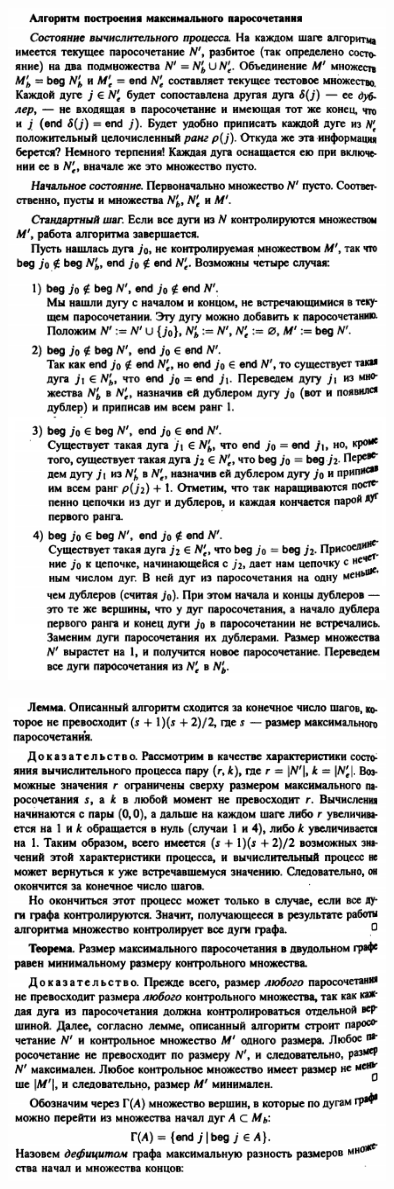 \documentclass[discrete.tex]{subfiles}
\begin{document}
\begin{figure}[H]
        \includegraphics[width=10cm]{pics/49_3}
        \centering
\end{figure}

\begin{figure}[H]
        \includegraphics[width=10cm]{pics/49_4}
        \centering
\end{figure}
\end{document}
